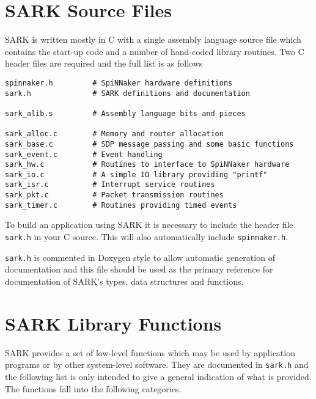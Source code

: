 \section{SARK Source Files}

SARK is written mostly in C with a single assembly language source
file which contains the start-up code and a number of hand-coded
library routines. Two C header files are required and the full list
is as follows

\begin{lstlisting}
spinnaker.h         # SpiNNaker hardware definitions
sark.h              # SARK definitions and documentation

sark_alib.s         # Assembly language bits and pieces

sark_alloc.c        # Memory and router allocation
sark_base.c         # SDP message passing and some basic functions
sark_event.c        # Event handling
sark_hw.c           # Routines to interface to SpiNNaker hardware
sark_io.c           # A simple IO library providing "printf"
sark_isr.c          # Interrupt service routines
sark_pkt.c          # Packet transmission routines
sark_timer.c        # Routines providing timed events
\end{lstlisting}

To build an application using SARK it is necessary to include the
header file \texttt{sark.h} in your C source. This will also
automatically include \texttt{spinnaker.h}.

\texttt{sark.h} is commented in Doxygen style to allow automatic
generation of documentation and this file should be used as the
primary reference for documentation of SARK's types, data structures
and functions.

\section{SARK Library Functions}

SARK provides a set of low-level functions which may be used by
application programs or by other system-level software. They are
documented in \texttt{sark.h} and the following list is only intended
to give a general indication of what is provided. The functions fall
into the following categories.

